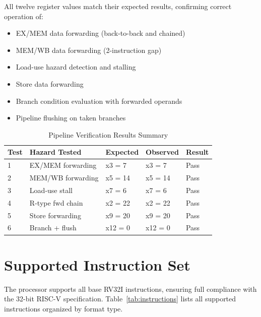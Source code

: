 \documentclass[12pt,a4paper]{report}
\begin{document}
All twelve register values match their expected results, confirming correct operation
of:
\begin{itemize}
    \item EX/MEM data forwarding (back-to-back and chained)
    \item MEM/WB data forwarding (2-instruction gap)
    \item Load-use hazard detection and stalling
    \item Store data forwarding
    \item Branch condition evaluation with forwarded operands
    \item Pipeline flushing on taken branches
\end{itemize}

\begin{table}[H]
\centering
\caption{Pipeline Verification Results Summary}
\label{tab:results}
\begin{tabular}{C{1.0cm} L{4.8cm} C{2.0cm} C{2.0cm} C{1.4cm}}
    \toprule
    \textbf{Test} & \textbf{Hazard Tested} & \textbf{Expected} & \textbf{Observed} & \textbf{Result} \\
     & EX/MEM forwarding      & x3 = 7   & x3 = 7   & Pass \\
    2 & MEM/WB forwarding      & x5 = 14  & x5 = 14  & Pass \\
    3 & Load-use stall         & x7 = 6   & x7 = 6   & Pass \\
    4 & R-type fwd chain       & x2 = 22  & x2 = 22  & Pass \\
    5 & Store forwarding       & x9 = 20  & x9 = 20  & Pass \\
    6 & Branch + flush         & x12 = 0  & x12 = 0  & Pass \\
    \bottomrule
\end{tabular}
\end{table}


\chapter{Supported Instruction Set}

The processor supports all base RV32I instructions, ensuring full compliance with the
32-bit RISC-V specification. Table~\ref{tab:instructions} lists all supported
instructions organized by format type.
\end{document}

